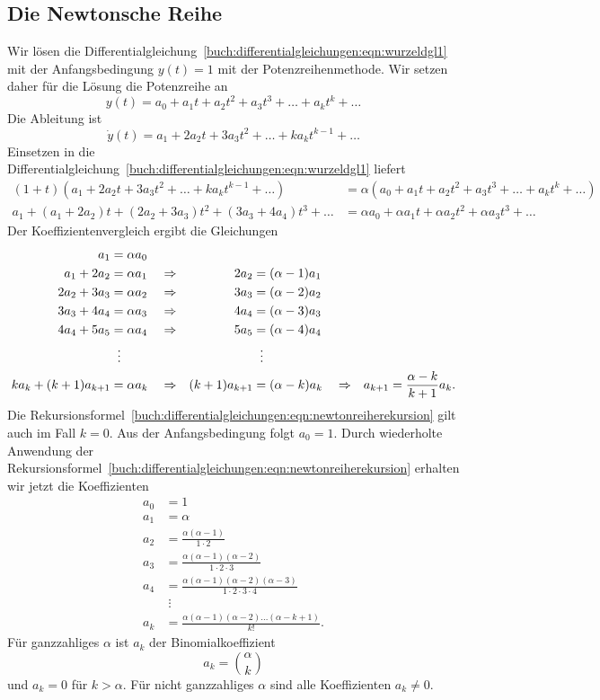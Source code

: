 %
%
\subsection{Die Newtonsche Reihe
\label{buch:differentialgleichungen:subsection:newtonschereihe}}
Wir lösen die
Differentialgleichung~\eqref{buch:differentialgleichungen:eqn:wurzeldgl1}
mit der Anfangsbedingung $y(t)=1$ mit der Potenzreihenmethode.
Wir setzen daher für die Lösung die Potenzreihe an
\[
y(t)
=
a_0 + a_1t + a_2t^2 + a_3t^3 + \dots + a_kt^k + \dots
\]
Die Ableitung ist
\[
\dot{y}(t)
=
a_1 + 2a_2t + 3a_3t^2 + \dots  + ka_kt^{k-1} + \dots
\]
Einsetzen in die 
Differentialgleichung~\eqref{buch:differentialgleichungen:eqn:wurzeldgl1}
liefert
\begin{align*}
(1+t)
(
a_1 + 2a_2t + 3a_3t^2 + \dots  + ka_kt^{k-1} + \dots
)
&=
\alpha
(
a_0 + a_1t + a_2t^2 + a_3t^3 + \dots + a_kt^k + \dots
)
\\
a_1
+(a_1+2a_2)t
+(2a_2+3a_3)t^2
+(3a_3+4a_4)t^3
+\dots
&=
\alpha a_0 + \alpha a_1t + \alpha a_2t^2 + \alpha a_3t^3 + \dots
\end{align*}
Der Koeffizientenvergleich ergibt die Gleichungen
\begin{align}
a_1&=\alpha a_0
\notag
\\
a_1+2a_2 &= \alpha a_1 &&\Rightarrow& 2a_2 &= (\alpha-1) a_1
\notag
\\
2a_2+3a_3 &= \alpha a_2&&\Rightarrow& 3a_3 &= (\alpha-2) a_2
\notag
\\
3a_3+4a_4 &= \alpha a_3&&\Rightarrow& 4a_4 &= (\alpha-3) a_3
\notag
\\
4a_4+5a_5 &= \alpha a_4&&\Rightarrow& 5a_5 &= (\alpha-4) a_4
\notag
\\
&\hspace*{2mm}\vdots
&&&&\hspace*{2mm}\vdots
\notag
\\
ka_k+(k+1)a_{k+1}&=\alpha a_k
&&\Rightarrow& (k+1)a_{k+1} &= (\alpha-k) a_k
&&\Rightarrow&
a_{k+1} = \frac{\alpha-k}{k+1}a_k.
\label{buch:differentialgleichungen:eqn:newtonreiherekursion}
\end{align}
%
Die
Rekursionsformel~\eqref{buch:differentialgleichungen:eqn:newtonreiherekursion}
gilt auch im Fall $k=0$.
Aus der Anfangsbedingung folgt $a_0=1$.
Durch wiederholte Anwendung der 
Rekursionsformel~\eqref{buch:differentialgleichungen:eqn:newtonreiherekursion}
erhalten wir jetzt die Koeffizienten
\begin{align*}
a_0&=1
\\
a_1&=\alpha
\\
a_2&=\frac{\alpha(\alpha-1)}{1\cdot 2}
\\
a_3&=\frac{\alpha(\alpha-1)(\alpha-2)}{1\cdot 2\cdot 3}
\\
a_4&=\frac{\alpha(\alpha-1)(\alpha-2)(\alpha-3)}{1\cdot 2\cdot 3\cdot 4}
\\
&\;\vdots
\\
a_k&=\frac{\alpha(\alpha-1)(\alpha-2)\dots(\alpha-k+1)}{k!}.
\end{align*}
Für ganzzahliges $\alpha$ ist $a_k$ der Binomialkoeffizient
\[
a_k=\binom{\alpha}{k}
\]
und $a_k=0$ für $k>\alpha$.
Für nicht ganzzahliges $\alpha$ sind alle Koeffizienten $a_k\ne 0$.

